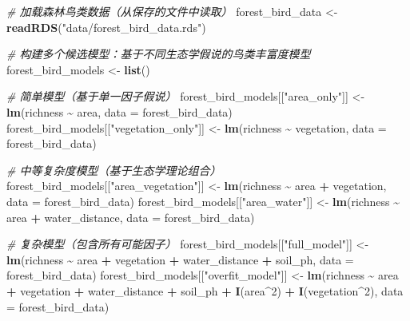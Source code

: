 \documentclass[
  twoside,12pt,fontset=none]{ctexbook}
\newenvironment{Shaded}{\begin{snugshade}}{\end{snugshade}}
\newcommand{\AttributeTok}[1]{\textcolor[rgb]{0.13,0.29,0.53}{#1}}
\newcommand{\CommentTok}[1]{\textcolor[rgb]{0.56,0.35,0.01}{\textit{#1}}}
\newcommand{\DecValTok}[1]{\textcolor[rgb]{0.00,0.00,0.81}{#1}}
\newcommand{\FunctionTok}[1]{\textcolor[rgb]{0.13,0.29,0.53}{\textbf{#1}}}
\newcommand{\NormalTok}[1]{#1}
\newcommand{\OtherTok}[1]{\textcolor[rgb]{0.56,0.35,0.01}{#1}}
\newcommand{\SpecialCharTok}[1]{\textcolor[rgb]{0.81,0.36,0.00}{\textbf{#1}}}
\newcommand{\StringTok}[1]{\textcolor[rgb]{0.31,0.60,0.02}{#1}}
\begin{document}
\begin{Shaded}
\begin{Highlighting}[]
\CommentTok{\# 加载森林鸟类数据（从保存的文件中读取）}
\NormalTok{forest\_bird\_data }\OtherTok{\textless{}{-}} \FunctionTok{readRDS}\NormalTok{(}\StringTok{"data/forest\_bird\_data.rds"}\NormalTok{)}

\CommentTok{\# 构建多个候选模型：基于不同生态学假说的鸟类丰富度模型}
\NormalTok{forest\_bird\_models }\OtherTok{\textless{}{-}} \FunctionTok{list}\NormalTok{()}

\CommentTok{\# 简单模型（基于单一因子假说）}
\NormalTok{forest\_bird\_models[[}\StringTok{"area\_only"}\NormalTok{]] }\OtherTok{\textless{}{-}} \FunctionTok{lm}\NormalTok{(richness }\SpecialCharTok{\textasciitilde{}}\NormalTok{ area, }\AttributeTok{data =}\NormalTok{ forest\_bird\_data)}
\NormalTok{forest\_bird\_models[[}\StringTok{"vegetation\_only"}\NormalTok{]] }\OtherTok{\textless{}{-}} \FunctionTok{lm}\NormalTok{(richness }\SpecialCharTok{\textasciitilde{}}\NormalTok{ vegetation, }\AttributeTok{data =}\NormalTok{ forest\_bird\_data)}

\CommentTok{\# 中等复杂度模型（基于生态学理论组合）}
\NormalTok{forest\_bird\_models[[}\StringTok{"area\_vegetation"}\NormalTok{]] }\OtherTok{\textless{}{-}} \FunctionTok{lm}\NormalTok{(richness }\SpecialCharTok{\textasciitilde{}}\NormalTok{ area }\SpecialCharTok{+}\NormalTok{ vegetation,}
  \AttributeTok{data =}\NormalTok{ forest\_bird\_data)}
\NormalTok{forest\_bird\_models[[}\StringTok{"area\_water"}\NormalTok{]] }\OtherTok{\textless{}{-}} \FunctionTok{lm}\NormalTok{(richness }\SpecialCharTok{\textasciitilde{}}\NormalTok{ area }\SpecialCharTok{+}\NormalTok{ water\_distance,}
  \AttributeTok{data =}\NormalTok{ forest\_bird\_data)}

\CommentTok{\# 复杂模型（包含所有可能因子）}
\NormalTok{forest\_bird\_models[[}\StringTok{"full\_model"}\NormalTok{]] }\OtherTok{\textless{}{-}} \FunctionTok{lm}\NormalTok{(richness }\SpecialCharTok{\textasciitilde{}}\NormalTok{ area }\SpecialCharTok{+}\NormalTok{ vegetation }\SpecialCharTok{+}
\NormalTok{  water\_distance }\SpecialCharTok{+}\NormalTok{ soil\_ph, }\AttributeTok{data =}\NormalTok{ forest\_bird\_data)}
\NormalTok{forest\_bird\_models[[}\StringTok{"overfit\_model"}\NormalTok{]] }\OtherTok{\textless{}{-}} \FunctionTok{lm}\NormalTok{(richness }\SpecialCharTok{\textasciitilde{}}\NormalTok{ area }\SpecialCharTok{+}\NormalTok{ vegetation }\SpecialCharTok{+}
\NormalTok{  water\_distance }\SpecialCharTok{+}\NormalTok{ soil\_ph }\SpecialCharTok{+} \FunctionTok{I}\NormalTok{(area}\SpecialCharTok{\^{}}\DecValTok{2}\NormalTok{) }\SpecialCharTok{+} \FunctionTok{I}\NormalTok{(vegetation}\SpecialCharTok{\^{}}\DecValTok{2}\NormalTok{),}
  \AttributeTok{data =}\NormalTok{ forest\_bird\_data)}
\end{Highlighting}
\end{Shaded}
\end{document}
